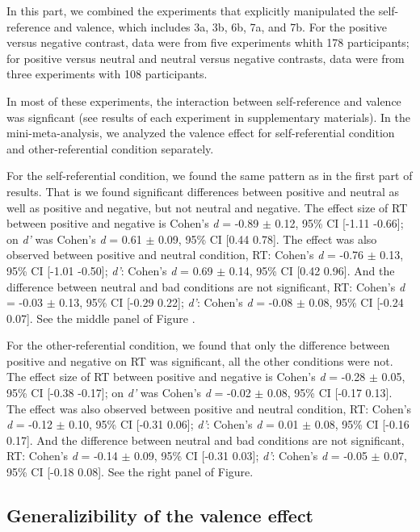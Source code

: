 \documentclass[
  man]{apa6}
\begin{document}
In this part, we combined the experiments that explicitly manipulated the self-reference and valence, which includes 3a, 3b, 6b, 7a, and 7b. For the positive versus negative contrast, data were from five experiments whith 178 participants; for positive versus neutral and neutral versus negative contrasts, data were from three experiments with 108 participants.

In most of these experiments, the interaction between self-reference and valence was signficant (see results of each experiment in supplementary materials). In the mini-meta-analysis, we analyzed the valence effect for self-referential condition and other-referential condition separately.

For the self-referential condition, we found the same pattern as in the first part of results. That is we found significant differences between positive and neutral as well as positive and negative, but not neutral and negative. The effect size of RT between positive and negative is Cohen's \emph{d} = -0.89 \(\pm\) 0.12, 95\% CI {[}-1.11 -0.66{]}; on \emph{d'} was Cohen's \emph{d} = 0.61 \(\pm\) 0.09, 95\% CI {[}0.44 0.78{]}. The effect was also observed between positive and neutral condition, RT: Cohen's \emph{d} = -0.76 \(\pm\) 0.13, 95\% CI {[}-1.01 -0.50{]}; \emph{d'}: Cohen's \emph{d} = 0.69 \(\pm\) 0.14, 95\% CI {[}0.42 0.96{]}. And the difference between neutral and bad conditions are not significant, RT: Cohen's \emph{d} = -0.03 \(\pm\) 0.13, 95\% CI {[}-0.29 0.22{]}; \emph{d'}: Cohen's \emph{d} = -0.08 \(\pm\) 0.08, 95\% CI {[}-0.24 0.07{]}. See the middle panel of Figure .

For the other-referential condition, we found that only the difference between positive and negative on RT was significant, all the other conditions were not. The effect size of RT between positive and negative is Cohen's \emph{d} = -0.28 \(\pm\) 0.05, 95\% CI {[}-0.38 -0.17{]}; on \emph{d'} was Cohen's \emph{d} = -0.02 \(\pm\) 0.08, 95\% CI {[}-0.17 0.13{]}. The effect was also observed between positive and neutral condition, RT: Cohen's \emph{d} = -0.12 \(\pm\) 0.10, 95\% CI {[}-0.31 0.06{]}; \emph{d'}: Cohen's \emph{d} = 0.01 \(\pm\) 0.08, 95\% CI {[}-0.16 0.17{]}. And the difference between neutral and bad conditions are not significant, RT: Cohen's \emph{d} = -0.14 \(\pm\) 0.09, 95\% CI {[}-0.31 0.03{]}; \emph{d'}: Cohen's \emph{d} = -0.05 \(\pm\) 0.07, 95\% CI {[}-0.18 0.08{]}. See the right panel of Figure.

\hypertarget{generalizibility-of-the-valence-effect}{%
\subsection{Generalizibility of the valence effect}\label{generalizibility-of-the-valence-effect}}
\end{document}
